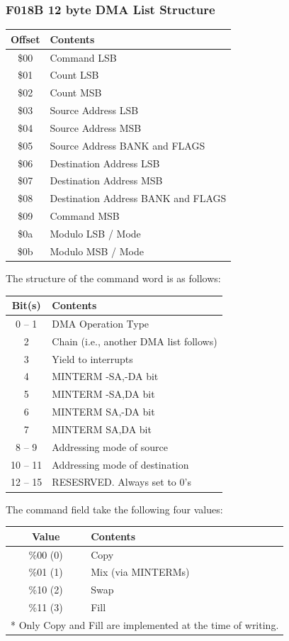 \subsubsection{F018B 12 byte DMA List Structure}
\begin{center}
\begin{tabular}{|c|l|}
  \hline
  Offset & Contents \\
  \hline
  \$00 & Command LSB \\
  \$01 & Count LSB \\
  \$02 & Count MSB \\
  \$03 & Source Address LSB  \\
  \$04 & Source Address MSB \\
  \$05 & Source Address BANK and FLAGS \\
  \$06 & Destination Address LSB  \\
  \$07 & Destination Address MSB \\
  \$08 & Destination Address BANK and FLAGS \\
  \$09 & Command MSB \\
  \$0a & Modulo LSB / Mode \\
  \$0b & Modulo MSB / Mode \\
  \hline
\end{tabular}
\end{center}

The structure of the command word is as follows:
\begin{center}
\begin{tabular}{|c|l|}
  \hline
  Bit(s) & Contents \\
  \hline
  0 -- 1 & DMA Operation Type \\
  2 & Chain (i.e., another DMA list follows) \\
  3 & Yield to interrupts \\
  4 & MINTERM -SA,-DA bit \\
  5 & MINTERM -SA,DA bit \\
  6 & MINTERM SA,-DA bit \\
  7 & MINTERM SA,DA bit \\
  8 -- 9 & Addressing mode of source \\
  10 -- 11 & Addressing mode of destination \\
  12 -- 15 & RESESRVED. Always set to 0's \\
  \hline
\end{tabular}
\end{center}

The command field take the following four values:
\begin{center}
\begin{tabular}{|c|l|}
  \hline
  Value & Contents \\
  \hline
  \%00 (0) & Copy \\
  \%01 (1) & Mix (via MINTERMs) \\
  \%10 (2) & Swap \\
  \%11 (3) & Fill \\
  \hline
  \multicolumn{2}{l}{* Only Copy and Fill are implemented at the time of writing.}
\end{tabular}
\end{center}


